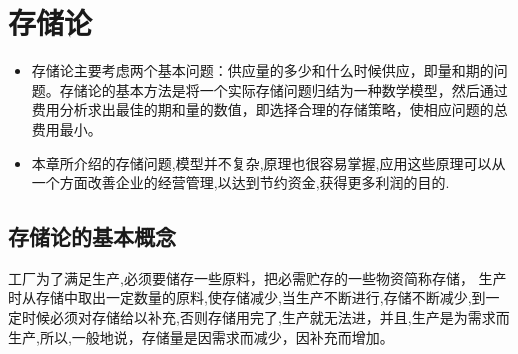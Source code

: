 \section{存储论}

\begin{frame}{\secname}
\begin{itemize}
    \item 存储论主要考虑两个基本问题：供应量的多少和什么时候供应，即量和期的问题。存储论的基本方法是将一个实际存储问题归结为一种数学模型，然后通过费用分析求出最佳的期和量的数值，即选择合理的存储策略，使相应问题的总费用最小。
    \item 本章所介绍的存储问题,模型并不复杂,原理也很容易掌握,应用这些原理可以从一个方面改善企业的经营管理,以达到节约资金,获得更多利润的目的.
\end{itemize}
\end{frame}

\subsection{存储论的基本概念}

\begin{frame}{\subsecname}
工厂为了满足生产,必须要储存一些原料，把必需贮存的一些物资简称存储， 生产时从存储中取出一定数量的原料,使存储减少,当生产不断进行,存储不断减少,到一定时候必须对存储给以补充,否则存储用完了,生产就无法进，并且,生产是为需求而生产,所以,一般地说，存储量是因需求而减少，因补充而增加。
\end{frame}